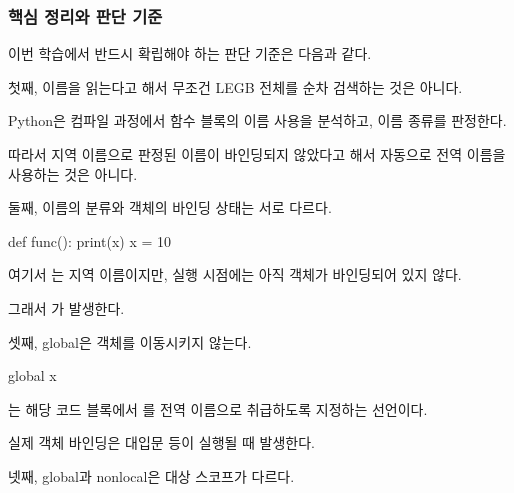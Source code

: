 \subsubsection{핵심 정리와 판단 기준}

이번 학습에서 반드시 확립해야 하는 판단 기준은 다음과 같다.

\begin{dhknote}
\begin{dhksmry}[centered]
첫째, 이름을 읽는다고 해서 무조건 LEGB 전체를
순차 검색하는 것은 아니다.
\end{dhksmry}
\end{dhknote}

Python은 컴파일 과정에서 함수 블록의 이름 사용을 분석하고, 이름 종류를 판정한다.

따라서 지역 이름으로 판정된 이름이 바인딩되지 않았다고 해서 자동으로 전역 이름을 사용하는 것은 아니다.

\begin{dhknote}
\begin{dhksmry}[centered]
둘째, 이름의 분류와 객체의 바인딩 상태는 서로 다르다.
\end{dhksmry}
\end{dhknote}

\begin{dhkcode}
def func():
    print(x)
    x = 10
\end{dhkcode}

여기서 는 지역 이름이지만,  실행 시점에는 아직 객체가 바인딩되어 있지 않다.

그래서 가 발생한다.

\begin{dhknote}
\begin{dhksmry}[centered]
셋째, global은 객체를 이동시키지 않는다.
\end{dhksmry}
\end{dhknote}

\begin{dhkcode}
global x
\end{dhkcode}

는 해당 코드 블록에서 를 전역 이름으로 취급하도록 지정하는 선언이다.

실제 객체 바인딩은 대입문 등이 실행될 때 발생한다.

\begin{dhknote}
\begin{dhksmry}[centered]
넷째, global과 nonlocal은 대상 스코프가 다르다.
\end{dhksmry}
\end{dhknote}


